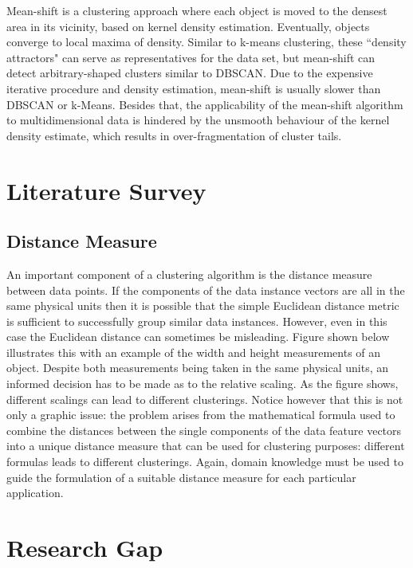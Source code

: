 \begin{itemize}
Mean-shift is a clustering approach where each object is moved to the densest area in its vicinity, based on kernel
density estimation. Eventually, objects converge to local maxima of density. Similar to k-means clustering, these
``density attractors" can serve as representatives for the data set, but mean-shift can detect arbitrary-shaped
clusters similar to DBSCAN. Due to the expensive iterative procedure and density estimation, mean-shift is usually
slower than DBSCAN or k-Means. Besides that, the applicability of the mean-shift algorithm to multidimensional data
is hindered by the unsmooth behaviour of the kernel density estimate, which results in over-fragmentation of cluster
tails.
\end{itemize}

\section{Literature Survey}

\subsection{Distance Measure}
An important component of a clustering algorithm is the distance measure between data points. If the components of the data instance vectors are all in the same physical units then it is possible that the simple Euclidean distance metric is sufficient to successfully group similar data instances. However, even in this case the Euclidean distance can sometimes be misleading. Figure shown below illustrates this with an example of the width and height measurements of an object. Despite both measurements being taken in the same physical units, an informed decision has to be made as to the relative scaling. As the figure shows, different scalings can lead to different clusterings.
Notice however that this is not only a graphic issue: the problem arises from the mathematical formula used to combine the distances between the single components of the data feature vectors into a unique distance measure that can be used for clustering purposes: different formulas leads to different clusterings.
Again, domain knowledge must be used to guide the formulation of a suitable distance measure for each particular application.

\section{Research Gap}

